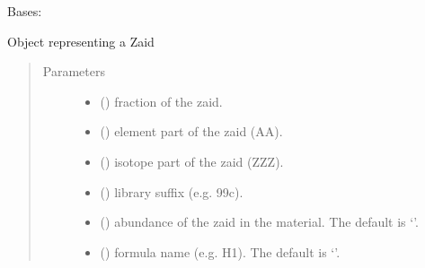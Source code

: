 \documentclass[letterpaper,10pt,english]{sphinxmanual}
\begin{document}
\begin{fulllineitems}
\label{\detokenize{api/inputgeneration:matreader.Zaid}}
Bases: 

Object representing a Zaid
\begin{quote}\begin{description}
\item[{Parameters}] \leavevmode\begin{itemize}
\item {} 
 () \textendash{} fraction of the zaid.

\item {} 
 () \textendash{} element part of the zaid (AA).

\item {} 
 () \textendash{} isotope part of the zaid (ZZZ).

\item {} 
 () \textendash{} library suffix (e.g. 99c).

\item {} 
 (\sphinxstyleliteralemphasis{\sphinxupquote{, }}) \textendash{} abundance of the zaid in the material. The default is ‘’.

\item {} 
 (\sphinxstyleliteralemphasis{\sphinxupquote{, }}) \textendash{} formula name (e.g. H1). The default is ‘’.

\end{itemize}


\end{description}
\end{quote}
\end{fulllineitems}
\end{document}
